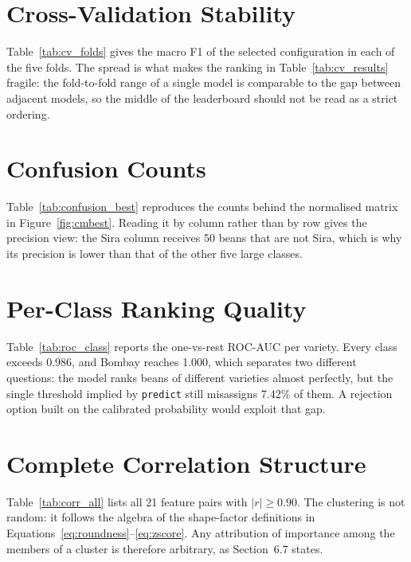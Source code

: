 \section{Cross-Validation Stability}

Table~\ref{tab:cv_folds} gives the macro F1 of the selected configuration in each
of the five folds. The spread is what makes the ranking in Table~\ref{tab:cv_results}
fragile: the fold-to-fold range of a single model is comparable to the gap between
adjacent models, so the middle of the leaderboard should not be read as a strict
ordering.



\section{Confusion Counts}

Table~\ref{tab:confusion_best} reproduces the counts behind the normalised matrix
in Figure~\ref{fig:cmbest}. Reading it by column rather than by row gives the
precision view: the Sira column receives 50 beans that are not Sira, which is why
its precision is lower than that of the other five large classes.



\section{Per-Class Ranking Quality}

Table~\ref{tab:roc_class} reports the one-vs-rest ROC-AUC per variety. Every class
exceeds 0.986, and Bombay reaches 1.000, which separates two different questions:
the model ranks beans of different varieties almost perfectly, but the single
threshold implied by \texttt{predict} still misassigns 7.42\% of them. A
rejection option built on the calibrated probability would exploit that gap.



\section{Complete Correlation Structure}

Table~\ref{tab:corr_all} lists all 21 feature pairs with $|r| \ge 0.90$. The
clustering is not random: it follows the algebra of the shape-factor definitions in
Equations~\eqref{eq:roundness}--\eqref{eq:zscore}. Any attribution of importance among the members of a cluster
is therefore arbitrary, as Section~6.7 states.


